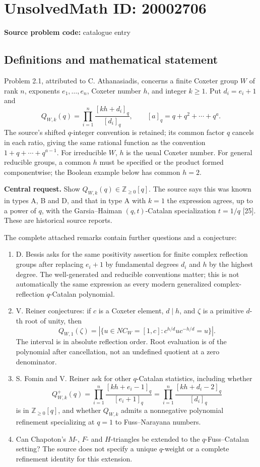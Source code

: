 \documentclass[11pt]{article}
\newcommand{\Z}{\mathbb{Z}}
\begin{document}
\section*{UnsolvedMath ID: 20002706}
\textbf{Source problem code:} catalogue entry
\subsection{Definitions and mathematical statement}
Problem 2.1, attributed to C. Athanasiadis, concerns a finite Coxeter group \(W\) of rank \(n\), exponents \(e_1,\ldots,e_n\), Coxeter number \(h\), and integer \(k\ge1\). Put \(d_i=e_i+1\) and
\[
 Q_{W,k}(q)=\prod_{i=1}^n\frac{[kh+d_i]_q}{[d_i]_q},
 \qquad [a]_q=q+q^2+\cdots+q^a.
\]
The source's shifted \(q\)-integer convention is retained; its common factor \(q\) cancels in each ratio, giving the same rational function as the convention \(1+q+\cdots+q^{a-1}\). For irreducible \(W\), \(h\) is the usual Coxeter number. For general reducible groups, a common \(h\) must be specified or the product formed componentwise; the Boolean example below has common \(h=2\).

\textbf{Central request.} Show \(Q_{W,k}(q)\in\Z_{\ge0}[q]\). The source says this was known in types A, B and D, and that in type A with \(k=1\) the expression agrees, up to a power of \(q\), with the Garsia--Haiman \((q,t)\)-Catalan specialization \(t=1/q\) [25]. These are historical source reports.

The complete attached remarks contain further questions and a conjecture:
\begin{enumerate}
\item D. Bessis asks for the same positivity assertion for finite complex reflection groups after replacing \(e_i+1\) by fundamental degrees \(d_i\) and \(h\) by the highest degree. The well-generated and reducible conventions matter; this is not automatically the same expression as every modern generalized complex-reflection \(q\)-Catalan polynomial.
\item V. Reiner conjectures: if \(c\) is a Coxeter element, \(d\mid h\), and \(\zeta\) is a primitive \(d\)-th root of unity, then
\[
 Q_{W,1}(\zeta)=
 |\{u\in NC_W=[1,c]:c^{h/d}u c^{-h/d}=u\}|.
\]
The interval is in absolute reflection order. Root evaluation is of the polynomial after cancellation, not an undefined quotient at a zero denominator.
\item S. Fomin and V. Reiner ask for other \(q\)-Catalan statistics, including whether
\[
 Q^+_{W,k}(q)=\prod_{i=1}^n
       \frac{[kh+e_i-1]_q}{[e_i+1]_q}
   =\prod_{i=1}^n\frac{[kh+d_i-2]_q}{[d_i]_q}
\]
is in \(\Z_{\ge0}[q]\), and whether \(Q_{W,k}\) admits a nonnegative polynomial refinement specializing at \(q=1\) to Fuss--Narayana numbers.
\item Can Chapoton's \(M\)-, \(F\)- and \(H\)-triangles be extended to the \(q\)-Fuss--Catalan setting? The source does not specify a unique \(q\)-weight or a complete refinement identity for this extension.
\end{enumerate}
\end{document}
